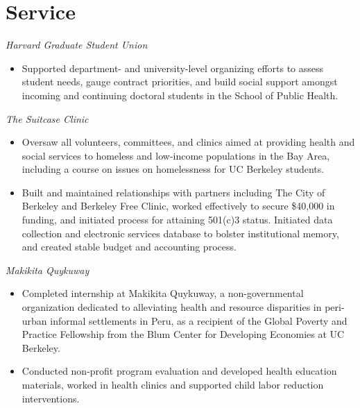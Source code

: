 \documentclass{cv_style}
\begin{document}

\section{Service}

\textit{Harvard Graduate Student Union}
\begin{itemize}
    \item Supported department- and university-level organizing efforts to assess student needs, gauge contract priorities, and build social support amongst incoming and continuing doctoral students in the School of Public Health. 
\end{itemize}

\textit{The Suitcase Clinic}
\begin{itemize}
    \item Oversaw all volunteers, committees, and clinics aimed at providing health and social services to homeless and low-income populations in the Bay Area, including a course on issues on homelessness for UC Berkeley  students. 
    \item \parskip 1pt Built and maintained relationships with partners including The City of Berkeley and Berkeley Free Clinic, worked effectively to secure \$40,000 in funding, and initiated process for attaining 501(c)3 status. Initiated data collection and electronic services database to bolster institutional memory, and created stable budget and accounting process.
\end{itemize}

\textit{Makikita Quykuway}
\begin{itemize}
    \item Completed internship at Makikita Quykuway, a non-governmental organization dedicated to alleviating health and resource disparities in peri-urban informal settlements in Peru, as a recipient of the Global Poverty and Practice Fellowship from the Blum Center for Developing Economies at UC Berkeley.
    \item \parskip 1pt Conducted non-profit program evaluation and developed health education materials, worked in health clinics and supported child labor reduction interventions.
\end{itemize}
\end{document}
